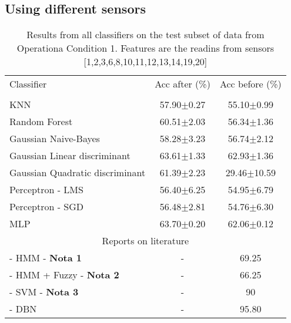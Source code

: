 \documentclass[review]{elsarticle}
\begin{document}
\subsection{Using different sensors} %
\label{sec:teste_com_diferentes_sensores}
\begin{table}[H]
\caption{Results from all classifiers on the test subset of data from Operationa Condition 1. Features are the readins from sensors [1,2,3,6,8,10,11,12,13,14,19,20]}
\centering

\begin{tabular}{lcc}
\toprule
\hline
Classifier   & Acc after (\%)  & Acc before (\%)\\ 
                      \\ \hline \hline 
KNN      			& 57.90$\pm$0.27 & 55.10$\pm$0.99 \\  
Random Forest        & 60.51$\pm$2.03 & 56.34$\pm$1.36 \\
Gaussian Naive-Bayes         & 58.28$\pm$3.23 & 56.74$\pm$2.12 \\
Gaussian Linear discriminant & 63.61$\pm$1.33 & 62.93$\pm$1.36 \\
Gaussian Quadratic discriminant & 61.39$\pm$2.23 & 29.46$\pm$10.59 \\
Perceptron - LMS & 56.40$\pm$6.25 & 54.95$\pm$6.79 \\
Perceptron - SGD & 56.48$\pm$2.81 & 54.76$\pm$6.30 \\
MLP & 63.70$\pm$0.20  & 62.06$\pm$0.12	 \\
\hline
\hline
\multicolumn{3}{c}{Reports on literature} \\
\hline
\hline
\cite{ramasso2009contribution} - HMM - \textbf{Nota 1}& -  & 69.25\\
\cite{ramasso2010prognostics} - HMM + Fuzzy - \textbf{Nota 2} & -  & 66.25\\
\cite{zhao2011comparison} - SVM - \textbf{Nota 3} & -  & 90\\
\cite{tamilselvan2013failure} - DBN & -  & 95.80 \\
\hline \hline

\bottomrule
\end{tabular}
\label{tab:clf_all}
\end{table}
\end{document}
